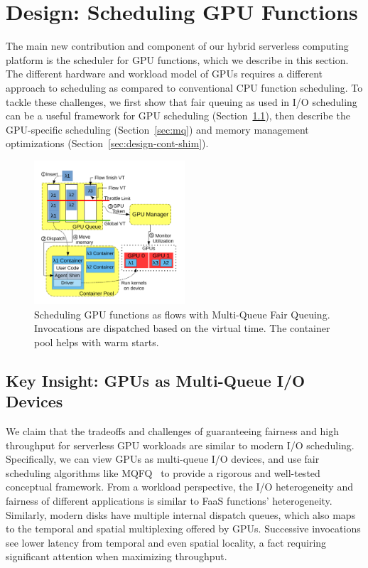 \section{Design: Scheduling GPU Functions}
\vspace*{\subsecspace}
\label{sec:design}

The main new contribution and component of our hybrid serverless computing platform is the scheduler for GPU functions, which we describe in this section. 
The different hardware and workload model of GPUs requires a different approach to scheduling as compared to conventional CPU function scheduling. 
To tackle these challenges, we first show that fair queuing as used in I/O scheduling can be a useful framework for GPU scheduling (Section~\ref{sec:d:mqfq}), then describe the GPU-specific scheduling (Section~\ref{sec:mq}) and memory management optimizations (Section~\ref{sec:design-cont-shim}). 

\begin{figure}
  \includegraphics[width=0.5\textwidth]{../figs/queue-sys-2-simple.pdf}
  \vspace*{-0.8cm}
  \caption{Scheduling GPU functions as flows with Multi-Queue Fair Queuing. Invocations are dispatched based on the virtual time. The container pool helps with warm starts.}
  \vspace{-0.25cm}
  \label{fig:sys-diag}
\end{figure}


\subsection{Key Insight: GPUs as Multi-Queue I/O Devices}
\label{sec:d:mqfq}

We claim that the tradeoffs and challenges of guaranteeing fairness and high throughput for serverless GPU workloads are similar to modern I/O scheduling.
Specifically, we can view GPUs as multi-queue I/O devices, and use fair scheduling algorithms like MQFQ~\cite{hedayati2019multi} to provide a rigorous and well-tested conceptual framework.
From a workload perspective, the I/O heterogeneity and fairness of different applications is similar to FaaS functions' heterogeneity.
Similarly, modern disks have multiple internal dispatch queues, which also maps to the temporal and spatial multiplexing offered by GPUs.
Successive invocations see lower latency from temporal and even spatial locality, a fact requiring significant attention when maximizing throughput.

